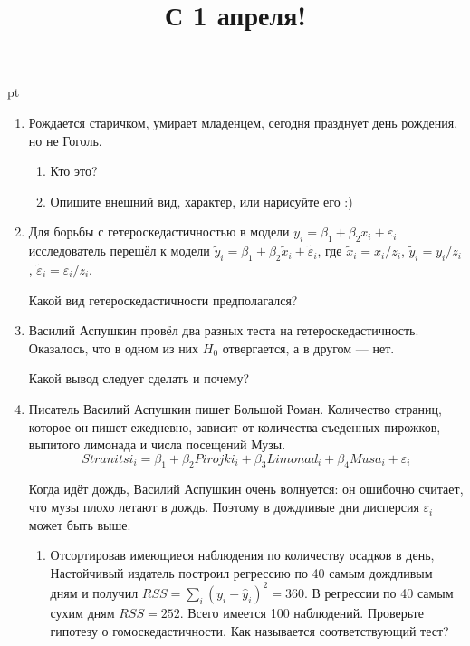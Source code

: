 \documentclass[pdftex,12pt,a4paper]{article}
\title{С 1 апреля!}
\date{}
\begin{document}
\maketitle
{} pt %



\begin{enumerate}

\item Рождается старичком, умирает младенцем, сегодня празднует день рождения, но не Гоголь. 
\begin{enumerate}
\item Кто это?
\item Опишите внешний вид, характер, или нарисуйте его :)
\end{enumerate}

\item Для борьбы с гетероскедастичностью в модели $y_i=\beta_1+\beta_2 x_i+\varepsilon_i$ исследователь перешёл к модели $\tilde{y}_i=\beta_1+\beta_2 \tilde{x}_i+\tilde{\varepsilon}_i$, где $\tilde{x}_i=x_i/z_i$, $\tilde{y}_i=y_i/z_i$, $\tilde{\varepsilon}_i=\varepsilon_i/z_i$. 

Какой вид гетероскедастичности предполагался?

\item Василий Аспушкин провёл два разных теста на гетероскедастичность. Оказалось, что в одном из них $H_0$ отвергается, а в другом --- нет. 

Какой вывод следует сделать и почему?


\item Писатель Василий Аспушкин пишет Большой Роман. Количество страниц, которое он пишет ежедневно, зависит от количества съеденных пирожков, выпитого лимонада и числа посещений Музы. 
\[
Stranitsi_i = \beta_1 + \beta_2 Pirojki_i + \beta_3 Limonad_i + \beta_4 Musa_i + \varepsilon_i
\]

Когда идёт дождь, Василий Аспушкин очень волнуется: он ошибочно считает, что музы плохо летают в дождь. Поэтому в дождливые дни дисперсия $\varepsilon_i$ может быть выше. 


\begin{enumerate}
\item Отсортировав имеющиеся наблюдения по количеству осадков в день, Настойчивый издатель построил регрессию по 40 самым дождливым дням и получил $RSS=\sum_i (y_i-\hat{y}_i)^2=360$. В регрессии по 40 самым сухим дням $RSS=252$. Всего имеется 100 наблюдений. Проверьте гипотезу о гомоскедастичности. Как называется соответствующий тест?


\end{enumerate}
\end{enumerate}
\end{document}
